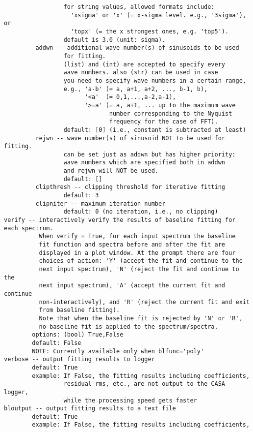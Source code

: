 \begin{verbatim}
                 for string values, allowed formats include:
                   'xsigma' or 'x' (= x-sigma level. e.g., '3sigma'), or
                   'topx' (= the x strongest ones, e.g. 'top5').
                 default is 3.0 (unit: sigma).
         addwn -- additional wave number(s) of sinusoids to be used 
                 for fitting. 
                 (list) and (int) are accepted to specify every
                 wave numbers. also (str) can be used in case
                 you need to specify wave numbers in a certain range,
                 e.g., 'a-b' (= a, a+1, a+2, ..., b-1, b),
                       '<a'  (= 0,1,...,a-2,a-1),
                       '>=a' (= a, a+1, ... up to the maximum wave
                              number corresponding to the Nyquist
                              frequency for the case of FFT).
                 default: [0] (i.e., constant is subtracted at least)
         rejwn -- wave number(s) of sinusoid NOT to be used for fitting.
                 can be set just as addwn but has higher priority:
                 wave numbers which are specified both in addwn
                 and rejwn will NOT be used. 
                 default: []
         clipthresh -- clipping threshold for iterative fitting
                 default: 3
         clipniter -- maximum iteration number
                 default: 0 (no iteration, i.e., no clipping)
verify -- interactively verify the results of baseline fitting for each spectrum.
          When verify = True, for each input spectrum the baseline
          fit function and spectra before and after the fit are 
          displayed in a plot window. At the prompt there are four
          choices of action: 'Y' (accept the fit and continue to the
          next input spectrum), 'N' (reject the fit and continue to the
          next input spectrum), 'A' (accept the current fit and continue
          non-interactively), and 'R' (reject the current fit and exit
          from baseline fitting).
          Note that when the baseline fit is rejected by 'N' or 'R',
          no baseline fit is applied to the spectrum/spectra. 
        options: (bool) True,False
        default: False
        NOTE: Currently available only when blfunc='poly'
verbose -- output fitting results to logger
        default: True
        example: If False, the fitting results including coefficients, 
                 residual rms, etc., are not output to the CASA logger, 
                 while the processing speed gets faster
bloutput -- output fitting results to a text file
        default: True
        example: If False, the fitting results including coefficients, 

\end{verbatim}
